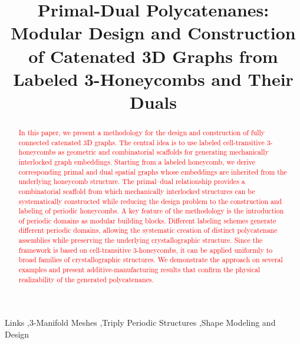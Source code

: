 \documentclass[times,twocolumn,final]{elsarticle}
\begin{document}

\begin{frontmatter}


\title{Primal-Dual Polycatenanes: Modular Design and Construction of Catenated 3D Graphs from Labeled 3-Honeycombs and Their Duals}




\received{\today}

\begin{abstract}
\textcolor{red}{In this paper, we present a methodology for the design and construction of fully connected catenated 3D graphs. The central idea is to use labeled cell-transitive 3-honeycombs as geometric and combinatorial scaffolds for generating mechanically interlocked graph embeddings. Starting from a labeled honeycomb, we derive corresponding primal and dual spatial graphs whose embeddings are inherited from the underlying honeycomb structure. The primal--dual relationship provides a combinatorial scaffold from which mechanically interlocked structures can be systematically constructed while reducing the design problem to the construction and labeling of periodic honeycombs. A key feature of the methodology is the introduction of periodic domains as modular building blocks. Different labeling schemes generate different periodic domains, allowing the systematic creation of distinct polycatenane assemblies while preserving the underlying crystallographic structure. Since the framework is based on cell-transitive 3-honeycombs, it can be applied uniformly to broad families of crystallographic structures. We demonstrate the approach on several examples and present additive-manufacturing results that confirm the physical realizability of the generated polycatenanes.}
\end{abstract}


\begin{keyword}
\KWD Links \sep 3-Manifold Meshes \sep Triply Periodic Structures \sep Shape Modeling and Design 
\end{keyword}

\end{frontmatter}
\end{document}
